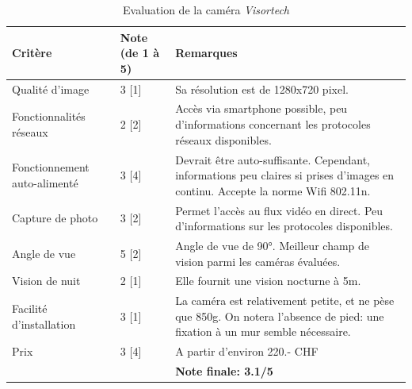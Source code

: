 \begin{table}[H]
    \centering
    \caption{Evaluation de la caméra \textit{Visortech}}
    \label{tab:visortech_eval}
    \begin{tabular}{@{}llp{8cm}@{}}
        \toprule
        Critère                      & Note (de 1 à 5) & Remarques                          \\ \midrule
        Qualité d'image              & 3 {[}1{]}       & Sa résolution est de 1280x720 pixel.                                                                                                  \\ [0.8ex]
        Fonctionnalités réseaux      & 2 {[}2{]}       & Accès via smartphone possible, peu d'informations concernant les protocoles réseaux disponibles.                                      \\ [0.8ex]
        Fonctionnement auto-alimenté & 3 {[}4{]}       & Devrait être auto-suffisante. Cependant, informations peu claires si prises d'images en continu. Accepte la norme Wifi 802.11n. \\ [0.8ex]
        Capture de photo             & 3 {[}2{]}       & Permet l'accès au flux vidéo en direct. Peu d'informations sur les protocoles disponibles.                                            \\ [0.8ex]
        Angle de vue                 & 5 {[}2{]}       & Angle de vue de 90°. Meilleur champ de vision parmi les caméras évaluées.                                                              \\ [0.8ex]
        Vision de nuit               & 2 {[}1{]}       & Elle fournit une vision nocturne à 5m.                                                                                                \\ [0.8ex]
        Facilité d'installation      & 3 {[}1{]}       & La caméra est relativement petite, et ne pèse que 850g. On notera l'absence de pied: une fixation à un mur semble nécessaire.         \\ [0.8ex]
        Prix                         & 3 {[}4{]}       & A partir d'environ 220.- CHF                                                                                                          \\ [0.8ex]
                                    &                 & \textbf{Note finale: 3.1/5} \\ \bottomrule
    \end{tabular}
\end{table}

